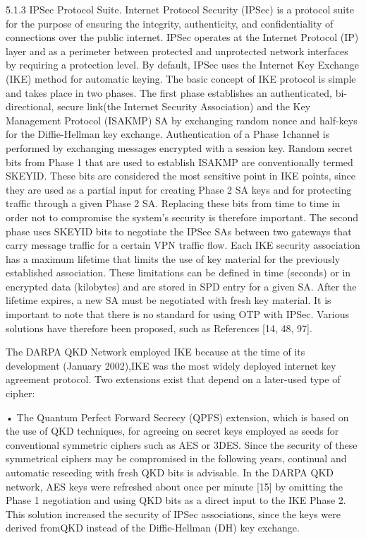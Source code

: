 5.1.3 IPSec Protocol Suite. Internet Protocol Security (IPSec) is a protocol suite for the purpose of ensuring the integrity, authenticity, and confidentiality of connections over the public internet. IPSec operates at the Internet Protocol (IP) layer and as a perimeter between protected and unprotected network interfaces by requiring a protection level. By default, IPSec uses the Internet Key Exchange (IKE) method for automatic keying. The basic concept of IKE protocol is simple and takes place in two phases. The first phase establishes an authenticated, bi-directional, secure link(the Internet Security Association) and the Key Management Protocol (ISAKMP) SA by exchanging random nonce and half-keys for the Diffie-Hellman key exchange. Authentication of a Phase 1channel is performed by exchanging messages encrypted with a session key. Random secret bits from Phase 1 that are used to establish ISAKMP are conventionally termed SKEYID. These bits are considered the most sensitive point in IKE points, since they are used as a partial input for creating Phase 2 SA keys and for protecting traffic through a given Phase 2 SA. Replacing these bits from time to time in order not to compromise the system’s security is therefore important.
The second phase uses SKEYID bits to negotiate the IPSec SAs between two gateways that carry message traffic for a certain VPN traffic flow. Each IKE security association has a maximum lifetime that limits the use of key material for the previously established association. These limitations can be defined in time (seconds) or in encrypted data (kilobytes) and are stored in SPD entry for a given SA. After the lifetime expires, a new SA must be negotiated with fresh key material. It is important to note that there is no standard for using OTP with IPSec. Various solutions have therefore been proposed, such as References [14, 48, 97].

The DARPA QKD Network employed IKE because at the time of its development (January 2002),IKE was the most widely deployed internet key agreement protocol. Two extensions exist that depend on a later-used type of cipher:

• The Quantum Perfect Forward Secrecy (QPFS) extension, which is based on the use of QKD techniques, for agreeing on secret keys employed as seeds for conventional symmetric ciphers such as AES or 3DES. Since the security of these symmetrical ciphers may be compromised in the following years, continual and automatic reseeding with fresh QKD bits is advisable. In the DARPA QKD network, AES keys were refreshed about once per minute [15] by omitting the Phase 1 negotiation and using QKD bits as a direct input to the IKE Phase 2. This solution increased the security of IPSec associations, since the keys were derived fromQKD instead of the Diffie-Hellman (DH) key exchange.

